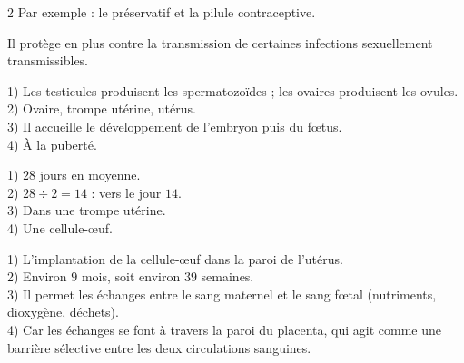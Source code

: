 \begin{multicols}{2}
Par exemple : le préservatif et la pilule contraceptive.

Il protège en plus contre la transmission de certaines infections sexuellement
transmissibles.

1) Les testicules produisent les spermatozoïdes ; les ovaires produisent les ovules.\\
2) Ovaire, trompe utérine, utérus.\\
3) Il accueille le développement de l'embryon puis du fœtus.\\
4) À la puberté.

1) $28$ jours en moyenne.\\
2) $28\div2=14$ : vers le jour $14$.\\
3) Dans une trompe utérine.\\
4) Une cellule-œuf.

1) L'implantation de la cellule-œuf dans la paroi de l'utérus.\\
2) Environ $9$ mois, soit environ $39$ semaines.\\
3) Il permet les échanges entre le sang maternel et le sang fœtal (nutriments,
dioxygène, déchets).\\
4) Car les échanges se font à travers la paroi du placenta, qui agit comme une barrière
sélective entre les deux circulations sanguines.

\end{multicols}
\exercicesBanner
